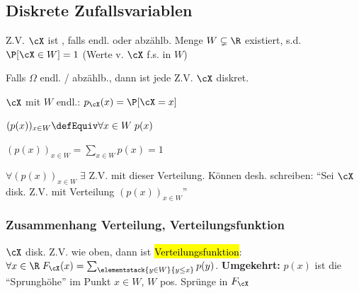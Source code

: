 \subsection{Diskrete Zufallsvariablen}
\shortdefinition Z.V. $\cX$ ist , falls endl. oder abzählb. Menge $W \subsetneq \R$ existiert, s.d. $\P[\cX \in W] = 1$ (Werte v. $\cX$ f.s. in $W$)

\shortremark Falls $\Omega$ endl. / abzählb., dann ist jede Z.V. $\cX$ diskret.

\shortdefinition[Gewichtsf.] $\cX$ mit $W$ endl.: $p_{\cX}(x) = \P[\cX = x]$

\shortdefinition[Verteilung] $(p(x))_{x \in W} \defEquiv \forall x \in W \; p(x)$

\shorttheorem $(p(x))_{x \in W} = \sum_{x \in W} p(x) = 1$

\shortremark $\forall (p(x))_{x \in W} \; \exists$ Z.V. mit dieser Verteilung. Können desh. schreiben:
``Sei $\cX$ disk. Z.V. mit Verteilung $(p(x))_{x \in W}$''


\subsubsection{Zusammenhang Verteilung, Verteilungsfunktion}
\shorttheorem $\cX$ disk. Z.V. wie oben, dann ist \hl{Verteilungsfunktion}: $\forall x \in \R \; F_\cX(x) = \sum_{\elementstack{y \in W}{y \leq x}} p(y)$.
\textbf{Umgekehrt:} $p(x)$ ist die ``Sprunghöhe'' im Punkt $x \in W$, $W$ pos. Sprünge in $F_\cX$
